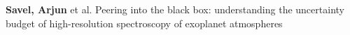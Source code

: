 


\item[{\color{numcolor}\scriptsize3}] \textbf{Savel, Arjun} et al. Peering into the black box: understanding the uncertainty budget of high-resolution spectroscopy of exoplanet atmospheres